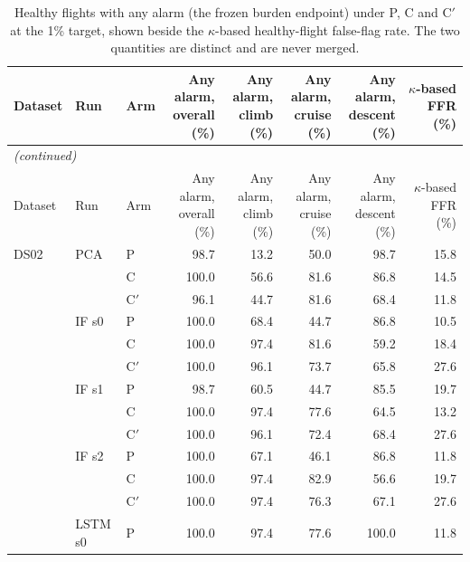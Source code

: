 \begin{scriptsize}
\begin{longtable}{lllrrrrr}
\caption{Healthy flights with any alarm (the frozen burden endpoint) under P, C and C$'$ at the 1\% target, shown beside the $\kappa$-based healthy-flight false-flag rate. The two quantities are distinct and are never merged.}\label{tab:s17_any_alarm}\\
\toprule
Dataset & Run & Arm & \makecell{Any alarm,\\overall (\%)} & \makecell{Any alarm,\\climb (\%)} & \makecell{Any alarm,\\cruise (\%)} & \makecell{Any alarm,\\descent (\%)} & \makecell{$\kappa$-based\\FFR (\%)} \\
\midrule
\endfirsthead
\multicolumn{8}{l}{\emph{(continued)}}\\
\toprule
Dataset & Run & Arm & \makecell{Any alarm,\\overall (\%)} & \makecell{Any alarm,\\climb (\%)} & \makecell{Any alarm,\\cruise (\%)} & \makecell{Any alarm,\\descent (\%)} & \makecell{$\kappa$-based\\FFR (\%)} \\
\midrule
\endhead
\bottomrule
\endfoot
DS02 & PCA & P & 98.7 & 13.2 & 50.0 & 98.7 & 15.8 \\
 &  & C & 100.0 & 56.6 & 81.6 & 86.8 & 14.5 \\
 &  & C$'$ & 96.1 & 44.7 & 81.6 & 68.4 & 11.8 \\
 & IF s0 & P & 100.0 & 68.4 & 44.7 & 86.8 & 10.5 \\
 &  & C & 100.0 & 97.4 & 81.6 & 59.2 & 18.4 \\
 &  & C$'$ & 100.0 & 96.1 & 73.7 & 65.8 & 27.6 \\
 & IF s1 & P & 98.7 & 60.5 & 44.7 & 85.5 & 19.7 \\
 &  & C & 100.0 & 97.4 & 77.6 & 64.5 & 13.2 \\
 &  & C$'$ & 100.0 & 96.1 & 72.4 & 68.4 & 27.6 \\
 & IF s2 & P & 100.0 & 67.1 & 46.1 & 86.8 & 11.8 \\
 &  & C & 100.0 & 97.4 & 82.9 & 56.6 & 19.7 \\
 &  & C$'$ & 100.0 & 97.4 & 76.3 & 67.1 & 27.6 \\
 & LSTM s0 & P & 100.0 & 97.4 & 77.6 & 100.0 & 11.8 \\

\end{longtable}
\end{scriptsize}
